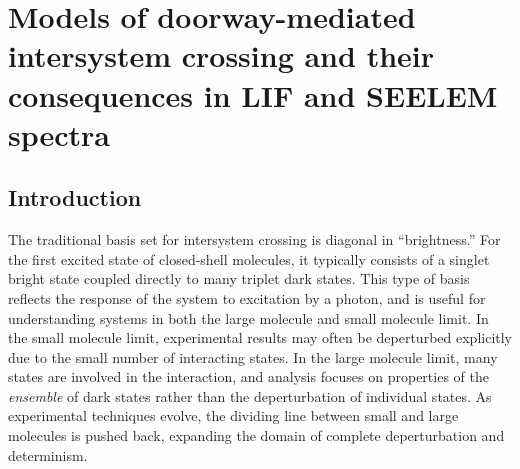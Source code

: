 



% 





 \chapter{Models of doorway-mediated intersystem crossing and their
   consequences in LIF and SEELEM spectra}
\label{chapter:models}

\section{Introduction}

The traditional basis set for intersystem crossing is diagonal in
``brightness.'' For the first excited state of closed-shell molecules,
it typically consists of a singlet bright state coupled directly to
many triplet dark states. This type of basis reflects the response of
the system to excitation by a photon, and is useful for understanding
systems in both the large molecule and small molecule limit. In the
small molecule limit, experimental results may often be deperturbed
explicitly due to the small number of interacting states. In the large
molecule limit, many states are involved in the interaction, and
analysis focuses on properties of the \emph{ensemble} of dark states
rather than the deperturbation of individual states.  As experimental
techniques evolve, the dividing line between small and large molecules
is pushed back, expanding the domain of complete deperturbation and
determinism.

